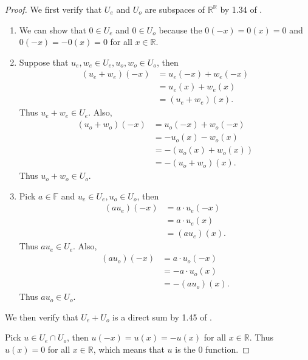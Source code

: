 \begin{proof}
We first verify that $U_e$ and $U_o$ are subspaces of $\mathbb{R}^\mathbb{R}$ by 1.34 of \cite{axler2014linear}.

\begin{enumerate}
\item We can show that $0\in U_e$ and $0\in U_o$ because the $0(-x)=0(x)=0$ and $0(-x)=-0(x)=0$ for all $x\in\mathbb{R}$.
\item Suppose that $u_e,w_e\in U_e, u_o,w_o \in U_o$, then
\begin{equation*}
\begin{split}
(u_e+w_e)(-x)&=u_e(-x)+w_e(-x)\\
&=u_e(x)+w_e(x)\\
&=(u_e+w_e)(x).
\end{split}
\end{equation*}
Thus $u_e+w_e\in U_e$. Also,
\begin{equation*}
\begin{split}
(u_o+w_o)(-x)&=u_o(-x)+w_o(-x)\\
&=-u_o(x)-w_o(x)\\
&=-(u_o(x)+w_o(x))\\
&=-(u_o+w_o)(x).
\end{split}
\end{equation*}
Thus $u_o+w_o\in U_o$.
\item Pick $a\in\mathbb{F}$ and $u_e\in U_e, u_o\in U_o$, then
\begin{equation*}
\begin{split}
(au_e)(-x)&=a\cdot u_e(-x)\\
&=a\cdot u_e(x)\\
&=(au_e)(x).
\end{split}
\end{equation*}
Thus $au_e\in U_e$. Also,
\begin{equation*}
\begin{split}
(au_o)(-x)&=a\cdot u_o(-x)\\
&=-a\cdot u_o(x)\\
&=-(au_o)(x).
\end{split}
\end{equation*}
Thus $au_o\in U_o$.
\end{enumerate}

We then verify that $U_e+U_o$ is a direct sum by 1.45 of \cite{axler2014linear}.

Pick $u\in U_e\cap U_o$, then $u(-x)=u(x)=-u(x)$ for all $x\in\mathbb{R}$. Thus $u(x)=0$ for all $x\in\mathbb{R}$, which means that $u$ is the $0$ function.


\end{proof}
